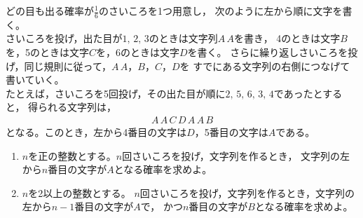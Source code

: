 \documentclass[../../main.tex]{subfiles}
\begin{document}
どの目も出る確率が$\displaystyle\frac{1}{6}$のさいころを1つ用意し，
次のように左から順に文字を書く。\\
さいころを投げ，出た目が$1, \, 2, \, 3$のときは文字列$A \, A$を書き，
4のときは文字$B$を，5のときは文字$C$を，6のときは文字$D$を書く。
さらに繰り返しさいころを投げ，同じ規則に従って，$A \, A$，$B$，$C$，$D$を
すでにある文字列の右側につなげて書いていく。\\
たとえば，さいころを5回投げ，その出た目が順に$2, \, 5, \, 6, \, 3, \, 4$であったとすると，
得られる文字列は，
\begin{align*}
  A \, A \, C \, D \, A \, A \, B
\end{align*}
となる。このとき，左から4番目の文字は$D$，5番目の文字は$A$である。
\begin{enumerate}
  \item $n$を正の整数とする。$n$回さいころを投げ，文字列を作るとき，
    文字列の左から$n$番目の文字が$A$となる確率を求めよ。
  \item $n$を2以上の整数とする。
    $n$回さいころを投げ，文字列を作るとき，文字列の左から$n-1$番目の文字が$A$で，
    かつ$n$番目の文字が$B$となる確率を求めよ。
\end{enumerate}
\end{document}
